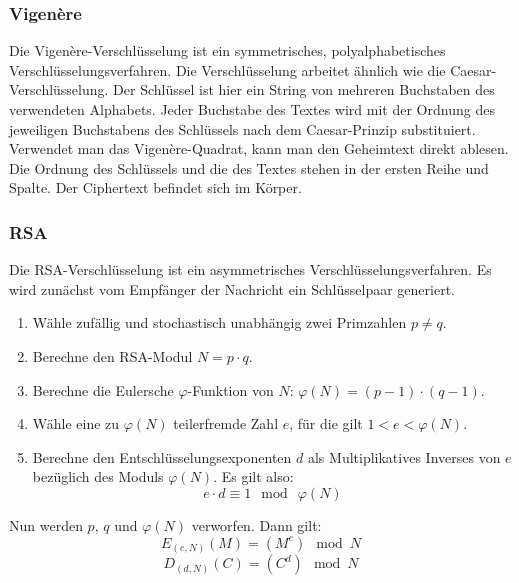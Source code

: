 \documentclass[a4paper,10pt,DIV9, BCOR12mm, oneside,openright,openbib]{scrreprt}
\theoremstyle{definition}
\theoremstyle{plain}
\begin{document}
\subsubsection{Vigenère}
Die Vigenère-Verschlüsselung ist ein symmetrisches, polyalphabetisches Verschlüsselungsverfahren. Die Verschlüsselung arbeitet ähnlich wie die Caesar-Verschlüsselung. Der Schlüssel ist hier ein String von mehreren Buchstaben des verwendeten Alphabets. Jeder Buchstabe des Textes wird mit der Ordnung des jeweiligen Buchstabens des Schlüssels nach dem Caesar-Prinzip substituiert. \\
Verwendet man das Vigenère-Quadrat, kann man den Geheimtext direkt ablesen. Die Ordnung des Schlüssels und die des Textes stehen in der ersten Reihe und Spalte. Der Ciphertext befindet sich im Körper.\\

\subsubsection{RSA}
Die RSA-Verschlüsselung ist ein asymmetrisches Verschlüsselungsverfahren. Es wird zunächst vom Empfänger der Nachricht ein Schlüsselpaar generiert.
\begin{enumerate}
 \item Wähle zufällig und stochastisch unabhängig zwei Primzahlen $p \neq q$.
 \item Berechne den RSA-Modul $N = p \cdot q$. 
 \item Berechne die Eulersche $\varphi$-Funktion von $N$: $\varphi(N) = (p-1) \cdot (q-1)$.
 \item Wähle eine zu $\varphi(N)$ teilerfremde Zahl $e$, für die gilt $1 < e < \varphi(N)$.
 \item Berechne den Entschlüsselungsexponenten $d$ als Multiplikatives Inverses von $e$ bezüglich des Moduls $\varphi(N)$. Es gilt also:
   \[ e \cdot d \equiv 1 \ \bmod\ \varphi(N) \]
\end{enumerate}
Nun werden $p$, $q$ und $\varphi(N)$ verworfen. Dann gilt:
\[E_{(e, N)}(M) = (M^{e}) \mod{N}\]
\[D_{(d, N)}(C) = (C^{d}) \mod{N}\]
\end{document}
